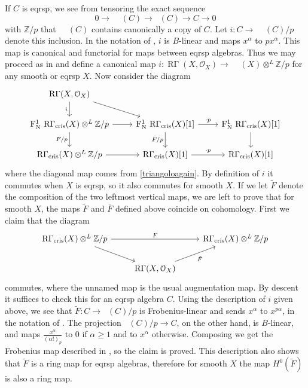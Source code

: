 \documentclass[11pt]{article}
\theoremstyle{plain}
\theoremstyle{definition}
\theoremstyle{remark}
\numberwithin{equation}{section}
\newcommand\Z{\mathbb{Z}}
\newcommand\calO{\mathcal{O}}
\DeclareMathOperator{\Rgam}{\text{R}\Gamma}                              %
\DeclareMathOperator{\Acr}{\mathbb{A}_{cris}}                            %
\DeclareMathOperator{\Rcris}{R\Gamma_{cris}}                             %
\DeclareMathOperator{\Nyg}{F_N^1}                                      %
\begin{document}
If $C$ is eqrsp, we see from tensoring the exact sequence
\[
0\to\Nyg{}\Acr(C)\to\Acr(C)\to C\to0
\]
with $\Z/p$ that $\Nyg{}\Acr(C)$ contains canonically a copy of $C$. Let $i:C\to\Nyg{}\Acr(C)/p$ denote this inclusion. In the notation of , $i$ is $B$-linear and maps $x^{\alpha}$ to $px^{\alpha}$. This map is canonical and functorial for maps between eqrsp algebras. Thus we may proceed as in  and define a canonical map $i:\Rgam(X,\calO_X)\to\Nyg{}\Rcris(X)\otimes^L\Z/p$ for any smooth or eqrsp $X$. Now consider the diagram
\[\begin{tikzcd}
	{\Rgam(X,\calO_X)} \\
	{\Nyg{}\Rcris(X)\otimes^L\Z/p} & {\Nyg{}\Rcris(X)[1]} & {\Nyg{}\Rcris(X)[1]} \\
	{\Rcris(X)\otimes^L\Z/p} & {\Rcris(X)[1]} & {\Rcris(X)[1]}
	\arrow["i"', from=1-1, to=2-1]
	\arrow[from=1-1, to=2-2]
	\arrow[from=2-1, to=2-2]
	\arrow["{F/p}"', from=2-1, to=3-1]
	\arrow["{\cdot p}", from=2-2, to=2-3]
	\arrow["{F/p}"', from=2-2, to=3-2]
	\arrow[from=2-3, to=3-3]
	\arrow[from=3-1, to=3-2]
	\arrow["{\cdot p}", from=3-2, to=3-3]
\end{tikzcd}\]
where the diagonal map comes from \eqref{triangoloagain}. By definition of $i$ it commutes when $X$ is eqrsp, so it also commutes for smooth $X$. If we let $\tilde{F}$ denote the composition of the two leftmost vertical maps, we are left to prove that for smooth $X$, the maps $\tilde{F}$ and $\overline{F}$ defined above coincide on cohomology. First we claim that the diagram
\[\begin{tikzcd}
	{\Rcris(X)\otimes^L\Z/p} && {\Rcris(X)\otimes^L\Z/p} \\
	& {\Rgam(X,\calO_X)}
	\arrow["F", from=1-1, to=1-3]
	\arrow[from=1-1, to=2-2]
	\arrow["{\tilde{F}}"', from=2-2, to=1-3]
\end{tikzcd}\]
commutes, where the unnamed map is the usual augmentation map. By descent it suffices to check this for an eqrsp algebra $C$. Using the description of $i$ given above, we see that $\tilde{F}:C\to\Acr(C)/p$ is Frobenius-linear and sends $x^{\alpha}$ to $x^{p\alpha}$, in the notation of . The projection $\Acr(C)/p\to C$, on the other hand, is $B$-linear, and maps $\frac{x^{\alpha}}{(\alpha!)_p}$ to $0$ if $\alpha\ge1$ and to $x^{\alpha}$ otherwise. Composing we get the Frobenius map described in , so the claim is proved. This description also shows that $\tilde{F}$ is a ring map for eqrsp algebras, therefore for smooth $X$ the map $H^0(\tilde{F})$ is also a ring map.
\end{document}
